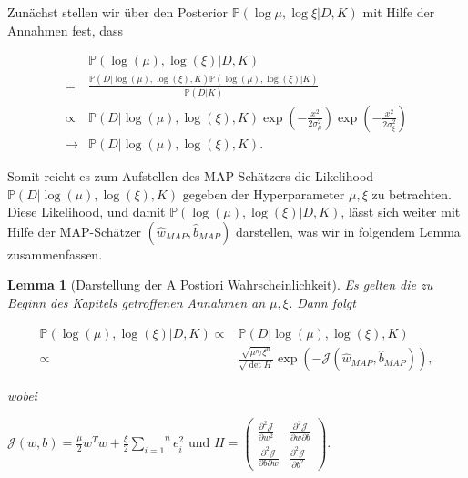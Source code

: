 \documentclass{report}
\theoremstyle{linebreak}
\newtheorem{lemma}[defi]{Lemma}
\begin{document}
Zunächst stellen wir über den Posterior $\mathbb{P}(\log \mu, \log \xi \vert D, K)$ mit Hilfe der Annahmen fest, dass

\begin{align*}
		& \mathbb{P}(\log(\mu), \log(\xi)\vert D, K)\\
	   =& \frac{\mathbb{P}(D\vert \log(\mu),\log(\xi),K)\mathbb{P}(\log(\mu), \log(\xi) 			  \vert K)}{\mathbb{P}(D\vert K)}  \\
\propto & \mathbb{P}(D\vert \log(\mu),\log(\xi),K)\exp(-\frac{x^2}{2\sigma_							  \mu^2})\exp(-\frac{x^2}{2\sigma_\xi^2})\\
\rightarrow & \mathbb{P}(D\vert \log(\mu),\log(\xi),K).
\end{align*}

Somit reicht es zum Aufstellen des MAP-Schätzers die Likelihood  $\mathbb{P}(D\vert \log(\mu),\log(\xi),K)$ gegeben der Hyperparameter $\mu, \xi$ zu betrachten. Diese Likelihood, und damit $\mathbb{P}(\log(\mu), \log(\xi)\vert D, K)$, lässt sich weiter mit Hilfe der MAP-Schätzer $(\hat{w}_{MAP}, \hat{b}_{MAP})$ darstellen, was wir in folgendem Lemma zusammenfassen.

\newpage

\begin{lemma}[Darstellung der A Postiori Wahrscheinlichkeit]

Es gelten die zu Beginn des Kapitels getroffenen Annahmen an $\mu, \xi$. Dann folgt

\begin{align*}
	\mathbb{P}(\log(\mu), \log(\xi)\vert D, K) \propto & \mathbb{P}(D\vert \log(\mu),			\log(\xi),K) \\
	\propto & \frac{\sqrt{\mu^{n_f} \xi^n}}	{\sqrt{\det H}} \exp(- \mathcal{J}(\hat{w}			_{MAP},\hat{b}_{MAP})),
\end{align*}

wobei 
\begin{center}
	$\mathcal{J}(w,b) = \frac{\mu}{2}w^T w + \frac{\xi}{2}\overset{n}{\underset{i=1}			{\sum}} e_i ^2 \text{ und } H = \begin{pmatrix}
	\frac{\partial^2 \mathcal{J}}{\partial w^2 } & \frac{\partial^2 \mathcal{J}}				{\partial w \partial b } \\
	\frac{\partial^2 \mathcal{J}}{\partial b \partial w } & \frac{\partial^2 					\mathcal{J}}{\partial b^2 }
	\end{pmatrix}.$
\end{center}

\end{lemma}
\end{document}
